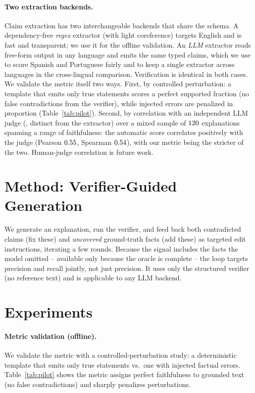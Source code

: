 \documentclass[11pt]{article}
\begin{document}
\paragraph{Two extraction backends.} Claim extraction has two interchangeable
backends that share the schema. A dependency-free \emph{regex} extractor (with light
coreference) targets English and is fast and transparent; we use it for the offline
validation. An \emph{LLM} extractor reads free-form output in any language and emits
the same typed claims, which we use to score Spanish and Portuguese fairly and to keep
a single extractor across languages in the cross-lingual comparison. Verification is
identical in both cases. We validate the metric itself two ways. First, by controlled perturbation: a template
that emits only true statements scores a perfect supported fraction (no false
contradictions from the verifier), while injected errors are penalized in proportion
(Table~\ref{tab:pilot}). Second, by correlation with an independent LLM judge
(\JudgeModel{}, distinct from the extractor) over a mixed sample of $120{}$
explanations spanning a range of faithfulness: the automatic score correlates
positively with the judge (Pearson $0.55{}$, Spearman $0.54{}$),
with our metric being the stricter of the two. Human-judge correlation is future
work.


\section{Method: Verifier-Guided Generation}\label{sec:method}
We generate an explanation, run the verifier, and feed back both contradicted claims
(fix these) and \emph{uncovered} ground-truth facts (add these) as targeted edit
instructions, iterating a few rounds. Because the signal includes the facts the model
omitted -- available only because the oracle is complete -- the loop targets precision and
recall jointly, not just precision. It uses only the structured verifier (no reference
text) and is applicable to any LLM backend.

\section{Experiments}\label{sec:exp}
\paragraph{Metric validation (offline).} We validate the metric with a
controlled-perturbation study: a deterministic template that emits only true
statements vs.\ one with injected factual errors. Table~\ref{tab:pilot} shows the
metric assigns perfect faithfulness to grounded text (no false contradictions)
and sharply penalizes perturbations.
\end{document}

